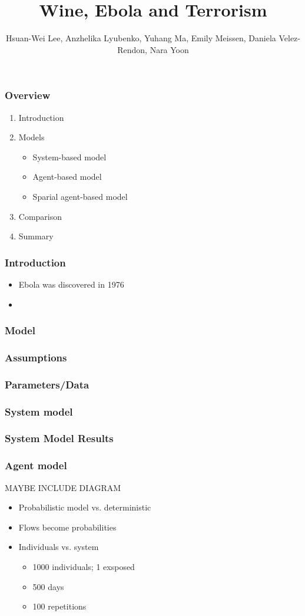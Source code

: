 \documentclass[30pt]{beamer}
\author{ Hsuan-Wei Lee,
  Anzhelika Lyubenko,
  Yuhang Ma,
  Emily Meissen,
  Daniela Velez-Rendon,
    Nara Yoon}
\title[]{Wine, Ebola and Terrorism}
\begin{document}
\begin{frame}[t,plain]
    \titlepage
\end{frame}

\begin{frame}[t,plain]
    \frametitle{Overview}
\begin{enumerate}
\vfill
\item Introduction
\item Models
\begin{itemize}
\item System-based model
\item Agent-based model
\item Sparial agent-based model
\end{itemize}
\item Comparison
\item Summary
\end{enumerate}
\end{frame}

\begin{frame}
\frametitle{Introduction}
\begin{itemize}
\item Ebola was discovered in 1976
\item 
\end{itemize}
\end{frame}

\begin{frame}
\frametitle{Model}

\end{frame}

\begin{frame}
\frametitle{Assumptions}
\end{frame}

\begin{frame}
\frametitle{Parameters/Data}
\end{frame}

\begin{frame}
\frametitle{System model}
\end{frame}

\begin{frame}
\frametitle{System Model Results}
\end{frame}

\begin{frame}
\frametitle{Agent model}
MAYBE INCLUDE DIAGRAM
\begin{itemize}
\item Probabilistic model vs. deterministic
\item Flows become probabilities
\item Individuals vs. system
\begin{itemize}
\item 1000 individuals; 1 exsposed
\item 500 days
\item 100 repetitions
\end{itemize}
\end{itemize}
\end{frame}
\end{document}
